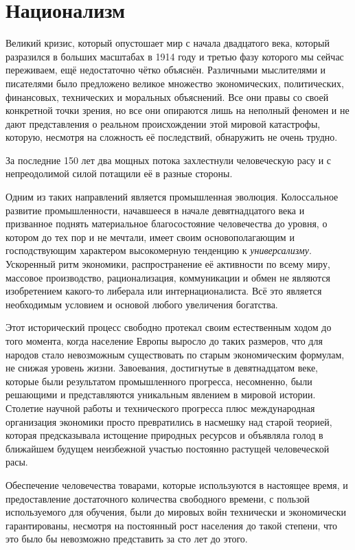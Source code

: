 \chapter{Национализм}

Великий кризис, который опустошает мир с начала двадцатого века, который разразился в больших масштабах в 1914 году и третью фазу которого мы сейчас переживаем, ещё недостаточно чётко объяснён. Различными мыслителями и писателями было предложено великое множество экономических, политических, финансовых, технических и моральных объяснений. Все они правы со своей конкретной точки зрения, но все они опираются лишь на неполный феномен и не дают представления о реальном происхождении этой мировой катастрофы, которую, несмотря на сложность её последствий, обнаружить не очень трудно.
 
За последние 150 лет два мощных потока захлестнули человеческую расу и с непреодолимой силой потащили её в разные стороны.

Одним из таких направлений является промышленная эволюция. Колоссальное развитие промышленности, начавшееся в начале девятнадцатого века и призванное поднять материальное благосостояние человечества до уровня, о котором до тех пор и не мечтали, имеет своим основополагающим и господствующим характером высокомерную тенденцию к \textit{универсализму}. Ускоренный ритм экономики, распространение её активности по всему миру, массовое производство, рационализация, коммуникации и обмен не являются изобретением какого-то либерала или интернационалиста. Всё это является необходимым условием и основой любого увеличения богатства.

Этот исторический процесс свободно протекал своим естественным ходом до того момента, когда население Европы выросло до таких размеров, что для народов стало невозможным существовать по старым экономическим формулам, не снижая уровень жизни. Завоевания, достигнутые в девятнадцатом веке, которые были результатом промышленного прогресса, несомненно, были решающими и представляются уникальным явлением в мировой истории. Столетие научной работы и технического прогресса плюс международная организация экономики просто превратились в насмешку над старой теорией, которая предсказывала истощение природных ресурсов и объявляла голод в ближайшем будущем неизбежной участью постоянно растущей человеческой расы.

Обеспечение человечества товарами, которые используются в настоящее время, и предоставление достаточного количества свободного времени, с пользой используемого для обучения, были до мировых войн технически и экономически гарантированы, несмотря на постоянный рост населения до такой степени, что это было бы невозможно представить за сто лет до этого.

